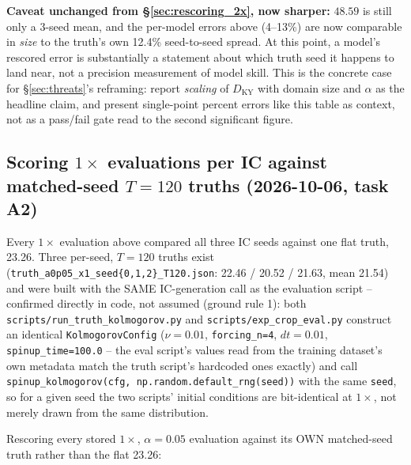 \documentclass[11pt]{article}
\begin{document}
\textbf{Caveat unchanged from \S\ref{sec:rescoring_2x}, now sharper:}
$48.59$ is still only a 3-seed mean, and the per-model errors above
(4--13\%) are now comparable in \emph{size} to the truth's own 12.4\%
seed-to-seed spread. At this point, a model's rescored error is
substantially a statement about which truth seed it happens to land
near, not a precision measurement of model skill. This is the concrete
case for \S\ref{sec:threats}'s reframing: report \emph{scaling} of
$D_{\mathrm{KY}}$ with domain size and $\alpha$ as the headline claim,
and present single-point percent errors like this table as context, not
as a pass/fail gate read to the second significant figure.

\subsection{Scoring $1\times$ evaluations per IC against matched-seed
$T{=}120$ truths (2026-10-06, task A2)}
\label{sec:rescoring_1x}

Every $1\times$ evaluation above compared all three IC seeds against one
flat truth, 23.26. Three per-seed, $T{=}120$ truths exist
(\texttt{truth\_a0p05\_x1\_seed\{0,1,2\}\_T120.json}: 22.46 / 20.52 /
21.63, mean 21.54) and were built with the SAME IC-generation call as
the evaluation script -- confirmed directly in code, not assumed
(ground rule 1): both \texttt{scripts/run\_truth\_kolmogorov.py} and
\texttt{scripts/exp\_crop\_eval.py} construct an identical
\texttt{KolmogorovConfig} ($\nu{=}0.01$, \texttt{forcing\_n=4},
$dt{=}0.01$, \texttt{spinup\_time=100.0} -- the eval script's values read
from the training dataset's own metadata match the truth script's
hardcoded ones exactly) and call
\texttt{spinup\_kolmogorov(cfg, np.random.default\_rng(seed))} with the
same \texttt{seed}, so for a given seed the two scripts' initial
conditions are bit-identical at $1\times$, not merely drawn from the
same distribution.

Rescoring every stored $1\times$, $\alpha{=}0.05$ evaluation against its
OWN matched-seed truth rather than the flat 23.26:
\end{document}
